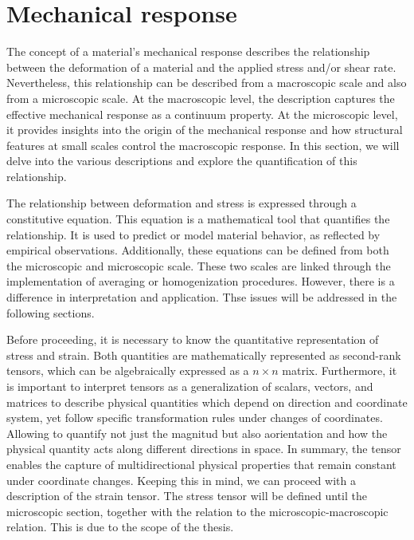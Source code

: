 \section{Mechanical response}

The concept of a material's mechanical response describes the relationship between the deformation of a material and the applied stress and/or shear rate.
Nevertheless, this relationship can be described from a macroscopic scale and also from a microscopic scale.
At the macroscopic level, the description captures the effective mechanical response as a continuum property. 
At the microscopic level, it provides insights into the origin of the mechanical response and how structural features at small scales control the macroscopic response.
In this section, we will delve into the various descriptions and explore the quantification of this relationship.

The relationship between deformation and stress is expressed through a constitutive equation.
This equation is a mathematical tool that quantifies the relationship. 
It is used to predict or model material behavior, as reflected by empirical observations.
Additionally, these equations can be defined from both the microscopic and microscopic scale.
These two scales are linked through the implementation of averaging or homogenization procedures.
However, there is a difference in interpretation and application.
Thse issues will be addressed in the following sections.

Before proceeding, it is necessary to know the quantitative representation of stress and strain.
Both quantities are mathematically represented as second-rank tensors, which can be algebraically expressed as a $n\times n$ matrix.
Furthermore, it is important to interpret tensors as a generalization of scalars, vectors, and matrices to describe physical quantities which depend on direction and coordinate system, yet follow specific transformation rules under changes of coordinates.
Allowing to quantify not just the magnitud but also aorientation and how the physical quantity acts along different directions in space.
In summary, the tensor enables the capture of multidirectional physical properties that remain constant under coordinate changes.
Keeping this in mind, we can proceed with a description of the strain tensor. The stress tensor will be defined until the microscopic section, together with the relation to the microscopic-macroscopic relation.
This is due to the scope of the thesis.

